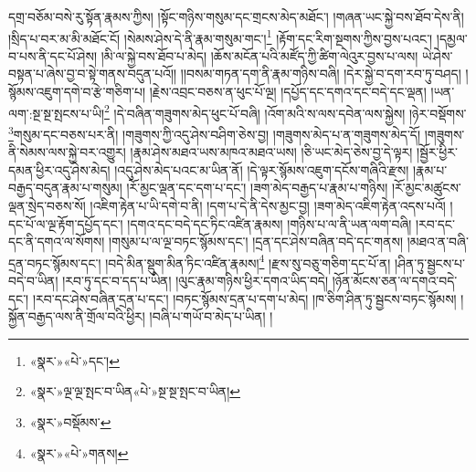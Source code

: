 དགྲ་བཅོམ་བསེ་རུ་སྟོན་རྣམས་ཀྱིས། །སྟོང་གཉིས་གསུམ་དང་གྲངས་མེད་མཐོང་། །གཞན་ཡང་སྐྱེ་བས་ཐོབ་དེས་ནི། །སྲིད་པ་བར་མ་མི་མཐོང་ངོ། །སེམས་ཤེས་དེ་ནི་རྣམ་གསུམ་གང་།\footnote{«སྣར་»«པེ་»དང་།} །རྟོག་དང་རིག་སྔགས་ཀྱིས་བྱས་པའང་། །དམྱལ་བ་པས་ནི་དང་པོ་ཤེས། །མི་ལ་སྐྱེ་བས་ཐོབ་པ་མེད། །ཆོས་མངོན་པའི་མཛོད་ཀྱི་ཚིག་ལེའུར་བྱས་པ་ལས། ཡེ་ཤེས་བསྟན་པ་ཞེས་བྱ་བ་སྟེ་གནས་བདུན་པའོ།། །།བསམ་གཏན་དག་ནི་རྣམ་གཉིས་བཞི། །དེར་སྐྱེ་བ་དག་རབ་ཏུ་བཤད། །སྙོམས་འཇུག་དགེ་བ་རྩེ་གཅིག་པ། །རྗེས་འབྲང་བཅས་ན་ཕུང་པོ་ལྔ། །དཔྱོད་དང་དགའ་དང་བདེ་དང་ལྡན། །ཡན་ལག་:སྔ་སྔ་སྤངས་པ་ཡི།\footnote{«སྣར་»ལྔ་ལྔ་སྤང་བ་ཡིན«པེ་»སྔ་སྔ་སྤང་བ་ཡིན།} །དེ་བཞིན་གཟུགས་མེད་ཕུང་པོ་བཞི། །འོག་མའི་ས་ལས་དབེན་ལས་སྐྱེས། །ཉེར་བསྡོགས་\footnote{«སྣར་»བསྡོམས་}གསུམ་དང་བཅས་པར་ནི། །གཟུགས་ཀྱི་འདུ་ཤེས་བཤིག་ཅེས་བྱ། །གཟུགས་མེད་པ་ན་གཟུགས་མེད་དོ། །གཟུགས་ནི་སེམས་ལས་སྐྱེ་བར་འགྱུར། །རྣམ་ཤེས་མཐའ་ཡས་མཁའ་མཐའ་ཡས། །ཅི་ཡང་མེད་ཅེས་བྱ་དེ་ལྟར། །སྦྱོར་ཕྱིར་དམན་ཕྱིར་འདུ་ཤེས་མེད། །འདུ་ཤེས་མེད་པའང་མ་ཡིན་ནོ། །དེ་ལྟར་སྙོམས་འཇུག་དངོས་གཞིའི་རྫས། །རྣམ་པ་བརྒྱད་བདུན་རྣམ་པ་གསུམ། །རོ་མྱང་ལྡན་དང་དག་པ་དང་། །ཟག་མེད་བརྒྱད་པ་རྣམ་པ་གཉིས། །རོ་མྱང་མཚུངས་ལྡན་སྲེད་བཅས་སོ། །འཇིག་རྟེན་པ་ཡི་དགེ་བ་ནི། །དག་པ་དེ་ནི་དེས་མྱང་བྱ། །ཟག་མེད་འཇིག་རྟེན་འདས་པའོ། །དང་པོ་ལ་ལྔ་རྟོག་དཔྱོད་དང་། །དགའ་དང་བདེ་དང་ཏིང་འཛིན་རྣམས། །གཉིས་པ་ལ་ནི་ཡན་ལག་བཞི། །རབ་དང་དང་ནི་དགའ་ལ་སོགས། །གསུམ་པ་ལ་ལྔ་བཏང་སྙོམས་དང་། །དྲན་དང་ཤེས་བཞིན་བདེ་དང་གནས། །མཐའ་ན་བཞི་དྲན་བཏང་སྙོམས་དང་། །བདེ་མིན་སྡུག་མིན་ཏིང་འཛིན་རྣམས།\footnote{«སྣར་»«པེ་»གནས།} །རྫས་སུ་བཅུ་གཅིག་དང་པོ་ན། །ཤིན་ཏུ་སྦྱངས་པ་བདེ་བ་ཡིན། །རབ་ཏུ་དང་བ་དད་པ་ཡིན། །ལུང་རྣམ་གཉིས་ཕྱིར་དགའ་ཡིད་བདེ། །ཉོན་མོངས་ཅན་ལ་དགའ་བདེ་དང་། །རབ་དང་ཤེས་བཞིན་དྲན་པ་དང་། །བཏང་སྙོམས་དྲན་པ་དག་པ་མེད། །ཁ་ཅིག་ཤིན་ཏུ་སྦྱངས་བཏང་སྙོམས། །སྐྱོན་བརྒྱད་ལས་ནི་གྲོལ་བའི་ཕྱིར། །བཞི་པ་གཡོ་བ་མེད་པ་ཡིན། །
